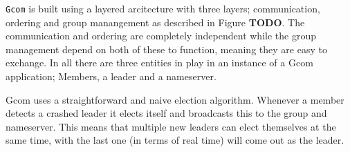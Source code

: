 	\texttt{Gcom} is built using a layered arcitecture with three layers; communication, ordering and group manangement as described in Figure \textbf{TODO}.
	The communication and ordering are completely independent while the group management depend on both of these to function, meaning they are easy to exchange.
	In all there are three entities in play in an instance of a Gcom application; Members, a leader and a nameserver.








	






		Gcom uses a straightforward and naive election algorithm.
		Whenever a member detects a crashed leader it elects itself and broadcasts this to the group and nameserver.
		This means that multiple new leaders can elect themselves at the same time, with the last one (in terms of real time) will come out as the leader.

